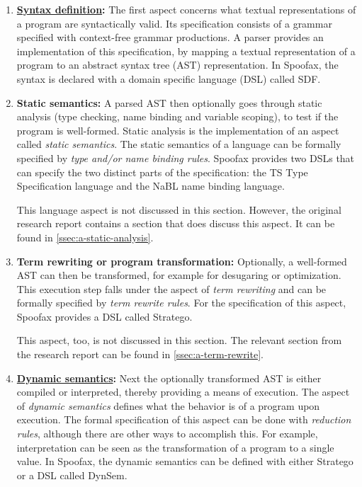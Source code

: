 \begin{enumerate}
\item \textbf{\hyperref[ssec:syntax-def]{Syntax definition}:} The first aspect
  concerns what textual representations of a program are syntactically
  valid. Its specification consists of a grammar specified with context-free
  grammar productions. A parser provides an implementation of this
  specification, by mapping a textual representation of a program to an abstract
  syntax tree (AST) representation. In Spoofax, the syntax is declared with a
  domain specific language (DSL) called SDF.
\item \textbf{Static semantics:} A parsed AST then optionally goes through
  static analysis (type checking, name binding and variable scoping), to test if
  the program is well-formed. Static analysis is the implementation of an aspect
  called \textit{static semantics}. The static semantics of a language can be
  formally specified by \textit{type and/or name binding rules}. Spoofax
  provides two DSLs that can specify the two distinct parts of the
  specification: the TS Type Specification language and the NaBL name binding
  language.

  This language aspect is not discussed in this section. However, the
  original research report contains a section that does discuss this aspect. It
  can be found in \cref{ssec:a-static-analysis}.
\item \textbf{Term rewriting or program transformation:} Optionally, a
  well-formed AST can then be transformed, for example for desugaring or
  optimization. This execution step falls under the aspect of \textit{term
    rewriting} and can be formally specified by \textit{term rewrite rules}. For
  the specification of this aspect, Spoofax provides a DSL called Stratego.

  This aspect, too, is not discussed in this section. The relevant section
  from the research report can be found in \cref{ssec:a-term-rewrite}.
\item \textbf{\hyperref[ssec:dynamic-semantics]{Dynamic semantics}:} Next the
  optionally transformed AST is either compiled or interpreted, thereby
  providing a means of execution. The aspect of \textit{dynamic semantics}
  defines what the behavior is of a program upon execution. The formal
  specification of this aspect can be done with \textit{reduction rules},
  although there are other ways to accomplish this. For example, interpretation
  can be seen as the transformation of a program to a single value. In Spoofax,
  the dynamic semantics can be defined with either Stratego or a DSL called
  DynSem.
\end{enumerate}

